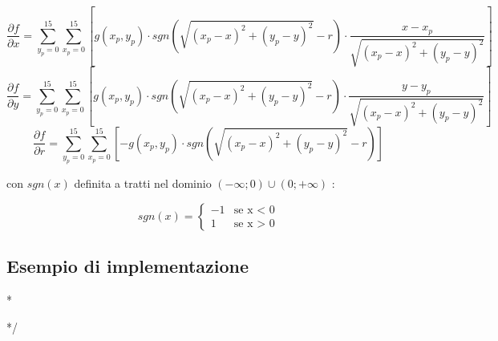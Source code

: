 \documentclass[12pt]{article}
\newenvironment{changemargin}[2]{%
    \begin{list}{}{%
    \setlength{\topsep}{0pt}%
    \setlength{\leftmargin}{#1}%
    \setlength{\rightmargin}{#2}%
    \setlength{\listparindent}{\parindent}%
    \setlength{\itemindent}{\parindent}%
    \setlength{\parsep}{\parskip}%
    }%
    \item[]}{\end{list}}
\begin{document}
        \begin {equation}
            \frac{\partial f}{\partial x} = \sum_{y_p = 0}^{15} \sum_{x_p = 0}^{15} \left[ g(x_p, y_p) \cdot sgn \left( \sqrt{(x_p-x)^2 + (y_p-y)^2} - r \right) \cdot \frac{x - x_p}{\sqrt{(x_p - x)^2 + (y_p - y)^2}} \right] 
        \end {equation}
        \begin {equation}
            \frac{\partial f}{\partial y} = \sum_{y_p = 0}^{15} \sum_{x_p = 0}^{15} \left[ g(x_p, y_p) \cdot sgn \left( \sqrt{(x_p-x)^2 + (y_p-y)^2} - r \right) \cdot \frac{y - y_p}{\sqrt{(x_p - x)^2 + (y_p - y)^2}} \right] 
        \end {equation}
        \begin {equation}
            \frac{\partial f}{\partial r} = \sum_{y_p = 0}^{15} \sum_{x_p = 0}^{15} \left[ - g(x_p, y_p) \cdot sgn \left( \sqrt{(x_p-x)^2 + (y_p-y)^2} - r \right) \right] 
        \end {equation}
        
        \noindent
        con $ sgn(x)$ definita a tratti nel dominio $(- \infty ; 0) \cup (0; +\infty) $ :
        
        \begin {equation}
            sgn(x) = 
                \begin{cases}
                  -1 & \text{se x < 0} \\
                  1 & \text{se x > 0}
                \end{cases}
        \end {equation}
        
    \subsection{Esempio di implementazione}

\/*
    \begin{changemargin}{-1cm}{-1cm}

    
    \end{changemargin}
*/    
  
   
    \vfill
    \let\thefootnote\relax{}
\end{document}
